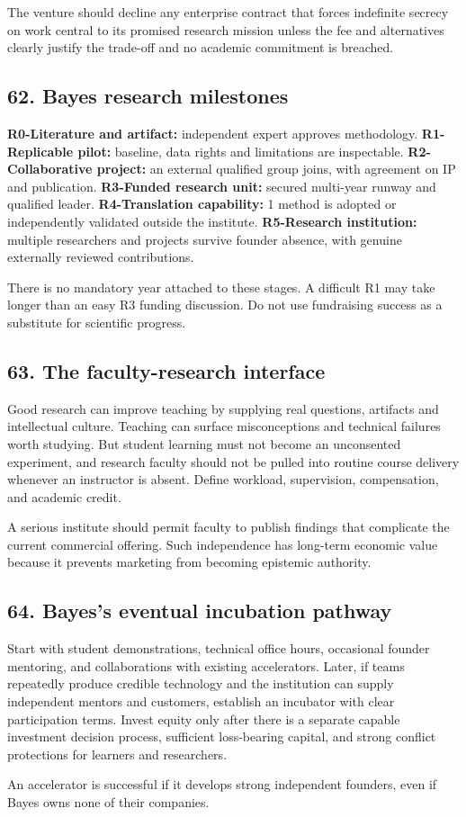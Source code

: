 The venture should decline any enterprise contract that forces indefinite secrecy on work central to its promised research mission unless the fee and alternatives clearly justify the trade-off and no academic commitment is breached.

\subsection{62. Bayes research milestones}

\textbf{R0-Literature and artifact:} independent expert approves methodology. \textbf{R1-Replicable pilot:} baseline, data rights and limitations are inspectable. \textbf{R2-Collaborative project:} an external qualified group joins, with agreement on IP and publication. \textbf{R3-Funded research unit:} secured multi-year runway and qualified leader. \textbf{R4-Translation capability:} 1 method is adopted or independently validated outside the institute. \textbf{R5-Research institution:} multiple researchers and projects survive founder absence, with genuine externally reviewed contributions.

There is no mandatory year attached to these stages. A difficult R1 may take longer than an easy R3 funding discussion. Do not use fundraising success as a substitute for scientific progress.

\subsection{63. The faculty-research interface}

Good research can improve teaching by supplying real questions, artifacts and intellectual culture. Teaching can surface misconceptions and technical failures worth studying. But student learning must not become an unconsented experiment, and research faculty should not be pulled into routine course delivery whenever an instructor is absent. Define workload, supervision, compensation, and academic credit.

A serious institute should permit faculty to publish findings that complicate the current commercial offering. Such independence has long-term economic value because it prevents marketing from becoming epistemic authority.

\subsection{64. Bayes's eventual incubation pathway}

Start with student demonstrations, technical office hours, occasional founder mentoring, and collaborations with existing accelerators. Later, if teams repeatedly produce credible technology and the institution can supply independent mentors and customers, establish an incubator with clear participation terms. Invest equity only after there is a separate capable investment decision process, sufficient loss-bearing capital, and strong conflict protections for learners and researchers.

An accelerator is successful if it develops strong independent founders, even if Bayes owns none of their companies.
